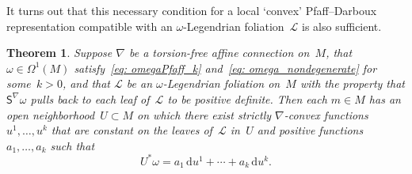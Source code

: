 \documentclass[11pt]{article}
\numberwithin{equation}{section}
\renewcommand{\d}{\mathrm{d}}%
\newcommand{\cL}{{\mathcal L}}
\newcommand{\Ss}{\mathsf{S}}
\numberwithin{equation}{section}
\newtheorem{Theorem}{Theorem}[section]
\begin{document}
It turns out that this necessary condition
for a local `convex' Pfaff--Darboux representation compatible
with an $\omega$-Legendrian foliation~$\cL$ is also sufficient.

\begin{Theorem}\label{thm: main}
Suppose $\nabla$ be a torsion-free affine
connection on~$M$, that $\omega\in\Omega^1(M)$
satisfy~\eqref{eq: omegaPfaff_k} and~\eqref{eq: omega_nondegenerate}
for some~$k>0$, and that $\cL$ be an $\omega$-Legendrian
foliation on~$M$ with the property that $\Ss^\nabla\omega$
pulls back to each leaf of~$\cL$ to be positive definite.
Then each $m\in M$ has an open neighborhood~$U\subset M$
on which there exist strictly $\nabla$-convex functions~$u^1,\ldots,u^k$
that are constant on the leaves of~$\cL$ in~$U$
and positive functions~$a_1,\ldots, a_k$ such that
\begin{equation*}
U^*\omega = a_1\,\d u^1 + \cdots + a_k\,\d u^k.
\end{equation*}
\end{Theorem}
\end{document}
